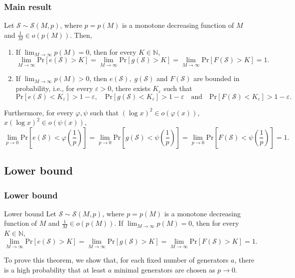 \documentclass{beamer}
\def\N{\ensuremath{\mathbb{N}}}
\def\Pr{\ensuremath{\mathrm{Pr}}}
\begin{document}
\begin{frame}
    \frametitle{Main result}
    \fontsize{8pt}{7.2}\selectfont
    \begin{theorem}\label{thm:main}
        Let $\mathcal{S} \sim \mathcal{S}(M, p)$, where $p = p(M)$ is a monotone decreasing function of $M$ and $\frac{1}{M} \in o(p(M))$. Then, 
    \begin{enumerate}
        \item If $\lim_{M \to \infty} p(M) = 0$, then for every $K \in \N$,   
        \[\lim_{M \to \infty} \Pr[e(\mathcal{S}) > K] = \lim_{M \to \infty} \Pr[g(\mathcal{S}) > K] = \lim_{M \to \infty} \Pr[F(\mathcal{S}) > K] = 1.\]
        \item If $\lim_{M \to \infty} p(M) > 0$, then $e(\mathcal{S}), \; g(\mathcal{S})$ and $F(\mathcal{S})$ are bounded in probability, i.e., for every $\varepsilon > 0$, there exists $K_\varepsilon$ such that 
        \[ \Pr[e(\mathcal{S}) < K_\varepsilon] > 1 - \varepsilon, \quad  \Pr[g(\mathcal{S}) < K_\varepsilon] > 1- \varepsilon \quad \text{and} \quad \Pr[F(\mathcal{S}) < K_\varepsilon] > 1 - \varepsilon.\]
    \end{enumerate}
    Furthermore, for every $\varphi, \psi$ such that $(\log x)^2 \in o(\varphi(x))$, $x(\log x)^2 \in o(\psi(x))$,
    \[\lim_{p \to 0} \Pr\left[e(\mathcal{S}) < \varphi\left(\frac{1}{p}\right)\right] = \lim_{p \to 0} \Pr\left[g(\mathcal{S}) < \psi\left(\frac{1}{p}\right)\right]  = \lim_{p \to 0} \Pr\left[F(\mathcal{S}) < \psi\left(\frac{1}{p}\right)\right] = 1.\]
    \end{theorem}
\end{frame}

\subsection{Lower bound}

\begin{frame}
\frametitle{Lower bound}
\begin{block}{Lower bound}
    Let $\mathcal{S} \sim \mathcal{S}(M, p)$, where $p = p(M)$ is a monotone decreasing function of $M$ and $\frac{1}{M} \in o(p(M))$.
    If $\lim_{M \to \infty} p(M) = 0$, then for every $K \in \N$,   
    \[\lim_{M \to \infty} \Pr[e(\mathcal{S}) > K] = \lim_{M \to \infty} \Pr[g(\mathcal{S}) > K] = \lim_{M \to \infty} \Pr[F(\mathcal{S}) > K] = 1.\]
\end{block}
To prove this theorem, we show that, for each fixed number of generators $a$, there is a high probability that at least $a$ minimal generators are chosen as $p \to 0$.
\end{frame}
\end{document}
